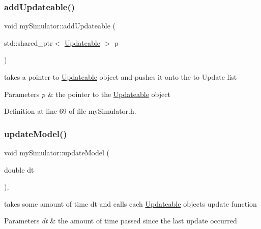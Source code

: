 \subsubsection{\texorpdfstring{addUpdateable()}{addUpdateable()}}
{\footnotesize\ttfamily void my\+Simulator\+::add\+Updateable (\begin{DoxyParamCaption}\item[{std\+::shared\+\_\+ptr$<$ \mbox{\hyperlink{class_updateable}{Updateable}} $>$}]{p }\end{DoxyParamCaption})\hspace{0.3cm}{\ttfamily [inline]}}



takes a pointer to \mbox{\hyperlink{class_updateable}{Updateable}} object and pushes it onto the to Update list 


\begin{DoxyParams}{Parameters}
{\em p} & the pointer to the \mbox{\hyperlink{class_updateable}{Updateable}} object \\
\hline
\end{DoxyParams}


Definition at line 69 of file my\+Simulator.\+h.


\begin{DoxyCode}{0}

\end{DoxyCode}
\mbox{\label{classmy_simulator_a76beefaa645d7785578a59b9f9d41dc9}} 
\subsubsection{\texorpdfstring{updateModel()}{updateModel()}}
{\footnotesize\ttfamily void my\+Simulator\+::update\+Model (\begin{DoxyParamCaption}\item[{double}]{dt }\end{DoxyParamCaption})\hspace{0.3cm}{\ttfamily [inline]}, {\ttfamily [virtual]}}



takes some amount of time dt and calls each \mbox{\hyperlink{class_updateable}{Updateable}} object\textquotesingle{}s update function 


\begin{DoxyParams}{Parameters}
{\em dt} & the amount of time passed since the last update occurred \\
\hline
\end{DoxyParams}


